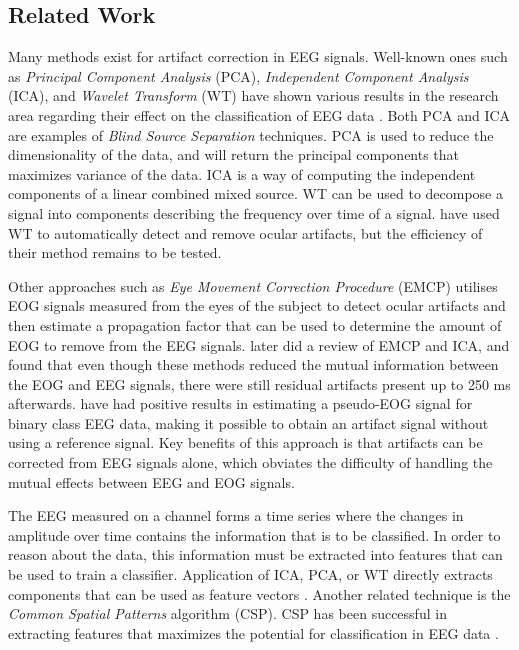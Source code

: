 \subsection{Related Work} \label{sec:relatedwork}
Many methods exist for artifact correction in EEG signals. Well-known ones such as \emph{Principal Component Analysis} (PCA), \emph{Independent Component Analysis} (ICA), and \emph{Wavelet Transform} (WT) have shown various results in the research area regarding their effect on the classification of EEG data   \citep{uriguen2015eeg}. Both PCA and ICA are examples of \emph{Blind Source Separation} techniques. PCA is used to reduce the dimensionality of the data, and will return the principal components that maximizes variance of the data. ICA is a way of computing the independent components of a linear combined mixed source. WT can be used to decompose a signal into components describing the frequency over time of a signal. \cite{krishnaveni2006automatic} have used WT to automatically detect and remove ocular artifacts, but the efficiency of their method remains to be tested.

Other approaches such as \emph{Eye Movement Correction Procedure} (EMCP) \citep{gratton1983new} utilises EOG signals measured from the eyes of the subject to detect ocular artifacts and then estimate a propagation factor that can be used to determine the amount of EOG to remove from the EEG signals. \cite{hoffmann2008correction} later did a review of EMCP and ICA, and found that even though these methods reduced the mutual information between the EOG and EEG signals, there were still residual artifacts present up to 250 ms afterwards. \cite{li2015ocular} have had positive results in estimating a pseudo-EOG signal for binary class EEG data, making it possible to obtain an artifact signal without using a reference signal. Key benefits of this approach is that artifacts can be corrected from EEG signals alone, which obviates the difficulty of handling the mutual effects between EEG and EOG signals.

The EEG measured on a channel forms a time series where the changes in amplitude over time contains the information that is to be classified. In order to reason about the data, this information must be extracted into features that can be used to train a classifier. Application of ICA, PCA, or WT directly extracts components that can be used as feature vectors \citep{uriguen2015eeg}. Another related technique is the \emph{Common Spatial Patterns} algorithm (CSP). CSP has been successful in extracting features that maximizes the potential for classification in EEG data \citep{ang2008filter,ang2012filter}.

